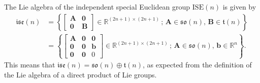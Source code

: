\begin{example}
    The Lie algebra of the independent special Euclidean group $\text{ISE}(n)$ is given by
    \begin{align*}
        \mathfrak{ise}(n) &= \left\{\begin{bmatrix}
            \mathbf{A} & \mathbf{0}\\
            \mathbf{0} & \mathbf{B}
        \end{bmatrix} \in \mathbb{R}^{(2n+1)\times(2n+1)}\,;\, \mathbf{A}\in\mathfrak{so}(n),\,\mathbf{B}\in\mathfrak{t}(n)\right\}\\
        &= \left\{\begin{bmatrix}
            \mathbf{A} & \mathbf{0} & \mathbf{0}\\
            \mathbf{0} & \mathbf{0} & \mathbf{b}\\
            \mathbf{0} & \mathbf{0} & 0
        \end{bmatrix} \in \mathbb{R}^{(2n+1)\times(2n+1)}\,;\, \mathbf{A}\in\mathfrak{so}(n),\,\mathbf{b}\in\mathbb{R}^n\right\}.
    \end{align*}
    This means that $\mathfrak{ise}(n) = \mathfrak{so}(n)\oplus\mathfrak{t}(n)$, as expected from the definition of the Lie algebra of a direct product of Lie groups.
\end{example}
